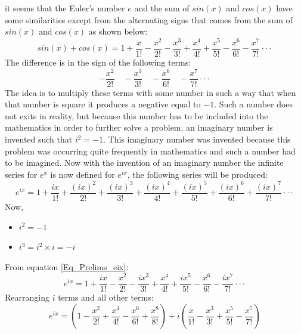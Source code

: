 it seems that the Euler's number $e$ and the sum of $sin(x)$ and $cos(x)$ have some similarities except from the alternating signs that comes from the sum of $sin(x)$ and $cos(x)$ as shown below:
\begin{equation}
	sin(x) + cos(x) = 1 + \frac{x}{1!} - \frac{x^{2}}{2!} - \frac{x^{3}}{3!} + \frac{x^{4}}{4!} + \frac{x^{5}}{5!} - \frac{x^{6}}{6!} - \frac{x^{7}}{7!} \cdot \cdot \cdot
\end{equation}
The difference is in the sign of the following terms:
\begin{equation*}
	- \frac{x^{2}}{2!} \quad - \frac{x^{3}}{3!} \quad - \frac{x^{6}}{6!} \quad - \frac{x^{7}}{7!} \cdot \cdot \cdot
\end{equation*}
The idea is to multiply these terms with some number in such a way that when that number is square it produces a negative equal to $-1$. Such a number does not exits in reality, but because this number has to be included into the mathematics in order to further solve a problem, an imaginary number is invented such that $i^2 = -1$. This imaginary number was invented because this problem was occurring quite frequently in mathematics and such a number had to be imagined. Now with the invention of an imaginary number the infinite series for $e^{x}$ is now defined for $e^{ix}$, the following series will be produced:
\begin{equation} \label{Eq_Prelims_eix}
	e^{ix} = 1 + \frac{ix}{1!} + \frac{(ix)^2}{2!} + \frac{(ix)^3}{3!} + \frac{(ix)^4}{4!} + \frac{(ix)^5}{5!} + \frac{(ix)^6}{6!} + \frac{(ix)^7}{7!} \cdot \cdot \cdot
\end{equation}
Now,
\begin{itemize}
	\item $i^2 = -1$
	\item $i^3 = i^2 \times i = -i$
\end{itemize}
From equation \ref{Eq_Prelims_eix}:
\begin{equation*}
	e^{ix} = 1 + \frac{ix}{1!} - \frac{x^{2}}{2!} - \frac{ix^{3}}{3!} + \frac{x^{4}}{4!} + \frac{ix^{5}}{5!} - \frac{x^{6}}{6!} - \frac{ix^{7}}{7!} \cdot \cdot \cdot
\end{equation*}
Rearranging $i$ terms and all other terms:
\begin{equation} \label{Eq_Premilms_eix2}
	e^{ix} = \left(1 - \frac{x^{2}}{2!} + \frac{x^{4}}{4!} - \frac{x^{6}}{6!} + \frac{x^8}{8!} \right)
			+ i \left( \frac{x}{1!} - \frac{x^{3}}{3!} + \frac{x^{5}}{5!} - \frac{x^{7}}{7!} \right)
\end{equation}
